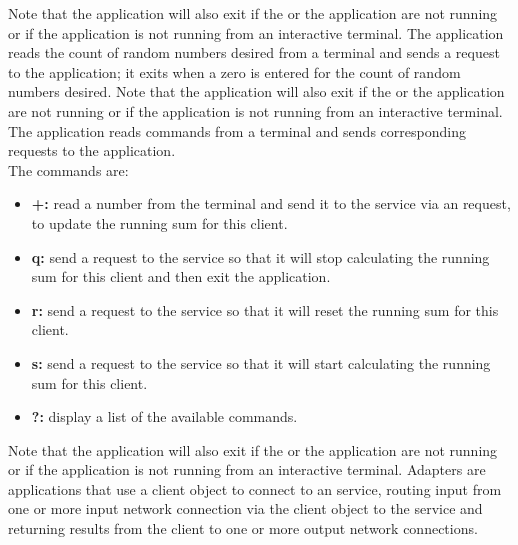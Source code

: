 Note that the application will also exit if the
 or the
 application are not running or if the application
is not running from an interactive terminal.
The  application reads the count of
random numbers desired from a terminal and sends a
 request to the
 application; it exits when a zero is
entered for the count of random numbers desired.
Note that the application will also exit if the
 or the
 application are not running or if the
application is not running from an interactive terminal.
The  application reads commands from a
terminal and sends corresponding requests to the
 application.\\

The commands are:
\begin{itemize}
\item \textbf{+:} read a number from the terminal and send it to the service via an
 request, to update the running sum for this
client.
\item \textbf{q:} send a  request to the
service so that it will stop calculating the running sum for this client and then exit the
application.
\item \textbf{r:} send a  request to the
service so that it will reset the running sum for this client.
\item \textbf{s:} send a  request to the
service so that it will start calculating the running sum for this client.
\item \textbf{?:} display a list of the available commands.
\end{itemize}
Note that the application will also exit if the
 or the
 application are not running or if the
application is not running from an interactive terminal.
\secondaryEnd{}
Adapters are applications that use a client object to connect to an \mplusm{} service,
routing input from one or more input \yarp{} network connection via the client object to
the service and returning results from the client to one or more output \yarp{} network
connections.\\


